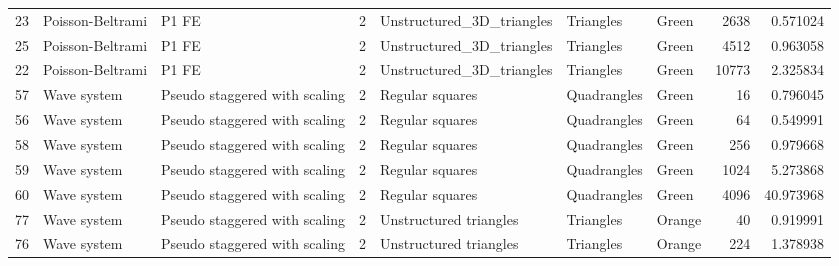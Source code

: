 \begin{tabular}{lllrlllrr}
23  &  Poisson-Beltrami &                          P1 FE &               2 &       Unstructured\_3D\_triangles &              Triangles  &                                Green &                     2638 &                         0.571024 \\
25  &  Poisson-Beltrami &                          P1 FE &               2 &       Unstructured\_3D\_triangles &              Triangles  &                                Green &                     4512 &                         0.963058 \\
22  &  Poisson-Beltrami &                          P1 FE &               2 &       Unstructured\_3D\_triangles &              Triangles  &                                Green &                    10773 &                         2.325834 \\
57  &       Wave system &  Pseudo staggered with scaling &               2 &                 Regular squares &            Quadrangles  &                                Green &                       16 &                         0.796045 \\
56  &       Wave system &  Pseudo staggered with scaling &               2 &                 Regular squares &            Quadrangles  &                                Green &                       64 &                         0.549991 \\
58  &       Wave system &  Pseudo staggered with scaling &               2 &                 Regular squares &            Quadrangles  &                                Green &                      256 &                         0.979668 \\
59  &       Wave system &  Pseudo staggered with scaling &               2 &                 Regular squares &            Quadrangles  &                                Green &                     1024 &                         5.273868 \\
60  &       Wave system &  Pseudo staggered with scaling &               2 &                 Regular squares &            Quadrangles  &                                Green &                     4096 &                        40.973968 \\
77  &       Wave system &  Pseudo staggered with scaling &               2 &          Unstructured triangles &              Triangles  &                               Orange &                       40 &                         0.919991 \\
76  &       Wave system &  Pseudo staggered with scaling &               2 &          Unstructured triangles &              Triangles  &                               Orange &                      224 &                         1.378938 \\

\end{tabular}
